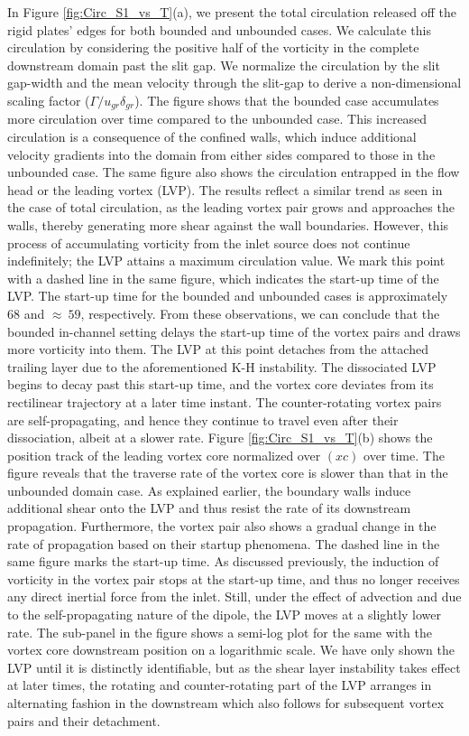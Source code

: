 \documentclass[final,3p,times,authoryear]{elsarticle}
\begin{document}
In Figure \ref{fig:Circ_S1_vs_T}(a), we present the total circulation released off the rigid plates' edges for both bounded and unbounded cases. We calculate this circulation by considering the positive half of the vorticity in the complete downstream domain past the slit gap. We normalize the circulation by the slit gap-width and the mean velocity through the slit-gap to derive a non-dimensional scaling factor ($\Gamma/u_{gr}\delta_{gr}$). The figure shows that the bounded case accumulates more circulation over time compared to the unbounded case. This increased circulation is a consequence of the confined walls, which induce additional velocity gradients into the domain from either sides compared to those in the unbounded case. The same figure also shows the circulation entrapped in the flow head or the leading vortex (LVP). The results reflect a similar trend as seen in the case of total circulation, as the leading vortex pair grows and approaches the walls, thereby generating more shear against the wall boundaries. However, this process of accumulating vorticity from the inlet source does not continue indefinitely; the LVP attains a maximum circulation value. We mark this point with a dashed line in the same figure, which indicates the start-up time of the LVP. The start-up time for the bounded and unbounded cases is approximately $68$ and $\approx \ 59$, respectively. From these observations, we can conclude that the bounded in-channel setting delays the start-up time of the vortex pairs and draws more vorticity into them. The LVP at this point detaches from the attached trailing layer due to the aforementioned K-H instability. The dissociated LVP begins to decay past this start-up time, and the vortex core deviates from its rectilinear trajectory at a later time instant. The counter-rotating vortex pairs are self-propagating, and hence they continue to travel even after their dissociation, albeit at a slower rate. 
Figure \ref{fig:Circ_S1_vs_T}(b) shows the position track of the leading vortex core normalized over  $(xc)$ over time. The figure reveals that the traverse rate of the vortex core is slower than that in the unbounded domain case. As explained earlier, the boundary walls induce additional shear onto the LVP and thus resist the rate of its downstream propagation. Furthermore, the vortex pair also shows a gradual change in the rate of propagation based on their startup phenomena. The dashed line in the same figure marks the start-up time. As discussed previously, the induction of vorticity in the vortex pair stops at the start-up time, and thus no longer receives any direct inertial force from the inlet. Still, under the effect of advection and due to the self-propagating nature of the dipole, the LVP moves at a slightly lower rate. The sub-panel in the figure shows a semi-log plot for the same with the vortex core downstream position on a logarithmic scale. We have only shown the LVP until it is distinctly identifiable, but as the shear layer instability takes effect at later times, the rotating and counter-rotating part of the LVP arranges in alternating fashion in the downstream which also follows for subsequent  vortex pairs and their detachment.
\end{document}
